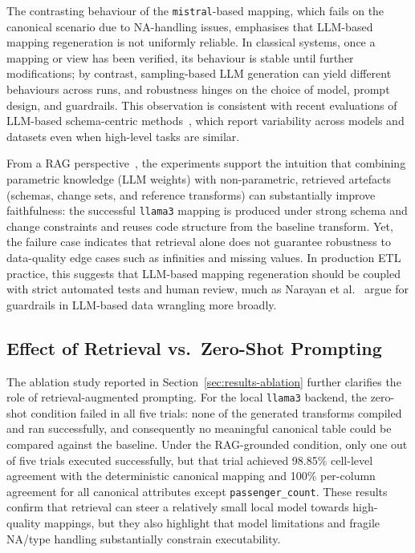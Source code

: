 The contrasting behaviour of the \texttt{mistral}-based mapping, which fails on the canonical scenario due to NA-handling issues, emphasises that LLM-based mapping regeneration is not uniformly reliable. In classical systems, once a mapping or view has been verified, its behaviour is stable until further modifications; by contrast, sampling-based LLM generation can yield different behaviours across runs, and robustness hinges on the choice of model, prompt design, and guardrails. This observation is consistent with recent evaluations of LLM-based schema-centric methods~\cite{buss2025towards,kayali2024mind}, which report variability across models and datasets even when high-level tasks are similar.

From a RAG perspective~\cite{lewis2020retrieval}, the experiments support the intuition that combining parametric knowledge (LLM weights) with non-parametric, retrieved artefacts (schemas, change sets, and reference transforms) can substantially improve faithfulness: the successful \texttt{llama3} mapping is produced under strong schema and change constraints and reuses code structure from the baseline transform. Yet, the failure case indicates that retrieval alone does not guarantee robustness to data-quality edge cases such as infinities and missing values. In production ETL practice, this suggests that LLM-based mapping regeneration should be coupled with strict automated tests and human review, much as Narayan et al.~\cite{narayan2022foundation} argue for guardrails in LLM-based data wrangling more broadly.


\subsection{Effect of Retrieval vs.\ Zero-Shot Prompting}
\label{sec:discussion-rag-ablation}

The ablation study reported in Section~\ref{sec:results-ablation} further clarifies the role of
retrieval-augmented prompting. For the local \texttt{llama3} backend, the zero-shot condition
failed in all five trials: none of the generated transforms compiled and ran successfully, and
consequently no meaningful canonical table could be compared against the baseline. Under the
RAG-grounded condition, only one out of five trials executed successfully, but that trial achieved
98.85\% cell-level agreement with the deterministic canonical mapping and 100\% per-column
agreement for all canonical attributes except \texttt{passenger\_count}. These results confirm that
retrieval can steer a relatively small local model towards high-quality mappings, but they also
highlight that model limitations and fragile NA/type handling substantially constrain executability.

